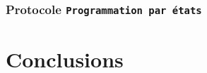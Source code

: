 \documentclass[a4paper,french,towsides,10pt]{book}
\begin{document}
\subsection{Protocole \texttt{Programmation par états}}



\chapter*{Conclusions}

\end{document}
